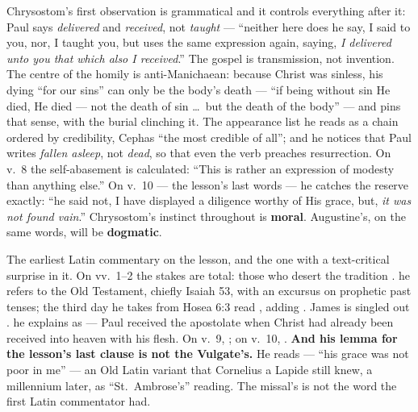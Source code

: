 \begin{witnessnote}
Chrysostom's first observation is grammatical and it controls everything after
it: Paul says \textit{delivered} and \textit{received}, not \textit{taught} ---
``neither here does he say, I said to you, nor, I taught you, but uses the same
expression again, saying, \textit{I delivered unto you that which also I
received}.'' The gospel is transmission, not invention. The centre of the
homily is anti-Manichaean: because Christ was sinless, his dying ``for our
sins'' can only be the body's death --- ``if being without sin He died, He died
--- not the death of sin \dots\ but the death of the body'' --- and
 pins that sense, with the burial clinching it. The
appearance list he reads as a chain ordered by credibility, Cephas ``the most
credible of all''; and he notices that Paul writes \textit{fallen asleep}, not
\textit{dead}, so that even the verb preaches resurrection. On v.~8 the
self-abasement is calculated: ``This is rather an expression of modesty than
anything else.'' On v.~10 --- the lesson's last words --- he catches the
reserve exactly: ``he said not, I have displayed a diligence worthy of His
grace, but, \textit{it was not found vain}.'' Chrysostom's instinct throughout
is \textbf{moral}. Augustine's, on the same words, will be \textbf{dogmatic}.
\end{witnessnote}

\begin{witnessnote}
The earliest Latin commentary on the lesson, and the one with a text-critical
surprise in it. On vv.~1--2 the stakes are total: those who desert the
tradition .  he refers to
the Old Testament, chiefly Isaiah 53, with an excursus on prophetic past
tenses; the third day he takes from Hosea 6:3 read ,
adding . James is singled out .  he explains as
 --- Paul received the apostolate when Christ had
already been received into heaven with his flesh. On v.~9, ; on v.~10, . \textbf{And his lemma for the lesson's last clause is not
the Vulgate's.} He reads 
--- ``his grace was not poor in me'' --- an Old Latin variant that Cornelius a
Lapide still knew, a millennium later, as ``St.~Ambrose's'' reading. The
missal's  is not the word the first Latin commentator had.
\end{witnessnote}

